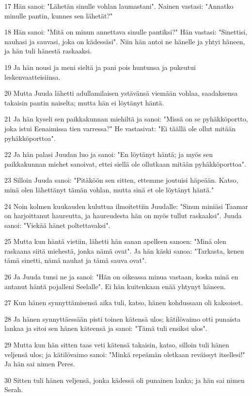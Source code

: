 \par 17 Hän sanoi: "Lähetän sinulle vohlan laumastani". Nainen vastasi: "Annatko minulle pantin, kunnes sen lähetät?"
\par 18 Hän sanoi: "Mitä on minun annettava sinulle pantiksi?" Hän vastasi: "Sinettisi, nauhasi ja sauvasi, joka on kädessäsi". Niin hän antoi ne hänelle ja yhtyi häneen, ja hän tuli hänestä raskaaksi.
\par 19 Ja hän nousi ja meni sieltä ja pani pois huntunsa ja pukeutui leskenvaatteisiinsa.
\par 20 Mutta Juuda lähetti adullamilaisen ystävänsä viemään vohlaa, saadaksensa takaisin pantin naiselta; mutta hän ei löytänyt häntä.
\par 21 Ja hän kyseli sen paikkakunnan miehiltä ja sanoi: "Missä on se pyhäkköportto, joka istui Eenaimissa tien varressa?" He vastasivat: "Ei täällä ole ollut mitään pyhäkköporttoa".
\par 22 Ja hän palasi Juudan luo ja sanoi: "En löytänyt häntä; ja myös sen paikkakunnan miehet sanoivat, ettei siellä ole ollutkaan mitään pyhäkköporttoa".
\par 23 Silloin Juuda sanoi: "Pitäköön sen sitten, ettemme joutuisi häpeään. Katso, minä olen lähettänyt tämän vohlan, mutta sinä et ole löytänyt häntä."
\par 24 Noin kolmen kuukauden kuluttua ilmoitettiin Juudalle: "Sinun miniäsi Taamar on harjoittanut haureutta, ja haureudesta hän on myös tullut raskaaksi". Juuda sanoi: "Viekää hänet poltettavaksi".
\par 25 Mutta kun häntä vietiin, lähetti hän sanan apelleen sanoen: "Minä olen raskaana siitä miehestä, jonka nämä ovat". Ja hän käski sanoa: "Tarkasta, kenen tämä sinetti, nämä nauhat ja tämä sauva ovat".
\par 26 Ja Juuda tunsi ne ja sanoi: "Hän on oikeassa minua vastaan, koska minä en antanut häntä pojalleni Seelalle". Ei hän kuitenkaan enää yhtynyt häneen.
\par 27 Kun hänen synnyttämisensä aika tuli, katso, hänen kohdussaan oli kaksoiset.
\par 28 Ja hänen synnyttäessään pisti toinen kätensä ulos; kätilövaimo otti punaista lankaa ja sitoi sen hänen käteensä ja sanoi: "Tämä tuli ensiksi ulos".
\par 29 Mutta kun hän sitten taas veti kätensä takaisin, katso, silloin tuli hänen veljensä ulos; ja kätilövaimo sanoi: "Minkä repeämän oletkaan reväissyt itsellesi!" Ja hän sai nimen Peres.
\par 30 Sitten tuli hänen veljensä, jonka kädessä oli punainen lanka; ja hän sai nimen Serah.

